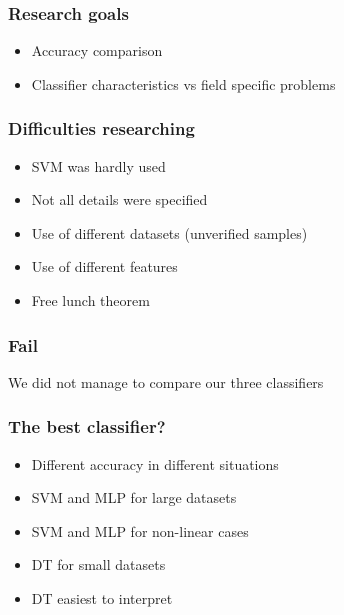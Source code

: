 \documentclass{beamer}
\begin{document}

\begin{frame}
\frametitle{Research goals}
\begin{itemize}
	\item Accuracy comparison
	\item Classifier characteristics vs field specific problems
	 
\end{itemize}
\end{frame}


\begin{frame}
\frametitle{Difficulties researching}
\begin{itemize}
	\item SVM was hardly used
	\item Not all details were specified
	\item Use of different datasets (unverified samples)
	\item Use of different features
	\item Free lunch theorem	 

\end{itemize}
\end{frame}


\begin{frame}
\frametitle{Fail}

\centerline{We did not manage to compare our three classifiers}

\end{frame}


\begin{frame}
\frametitle{The best classifier?}
\begin{itemize}
	\item Different accuracy in different situations
	\item SVM and MLP for large datasets
	\item SVM and MLP for non-linear cases
	\item DT for small datasets
	\item DT easiest to interpret
	
\end{itemize}
\end{frame}
\end{document}
